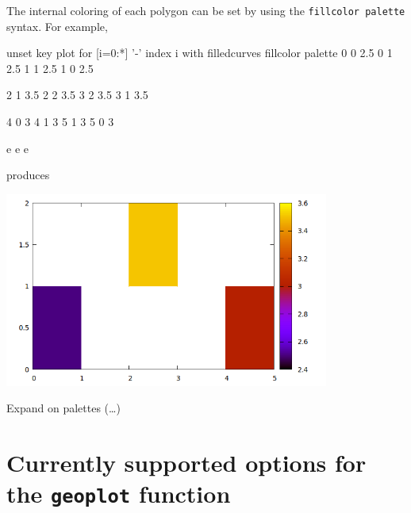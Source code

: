 \documentclass{article}
\begin{document}
\medskip

The internal coloring of each polygon can be set by using the
\texttt{fillcolor palette} syntax. For example,
\begin{scriptsize}
\begin{code}
unset key
plot for [i=0:*] '-' index i with filledcurves fillcolor palette
	0 0 2.5 
	0 1 2.5
	1 1 2.5
	1 0 2.5

	2 1 3.5 
	2 2 3.5
	3 2 3.5
	3 1 3.5

	4 0 3 
	4 1 3
	5 1 3
	5 0 3

e
e
e        
\end{code}
\end{scriptsize}
produces
\begin{center}
  \includegraphics[width=0.8\textwidth]{squares}
\end{center}

Expand on palettes (\ldots)

\section{Currently supported options for the \texttt{geoplot} function}
\label{sec:opts}
\end{document}
